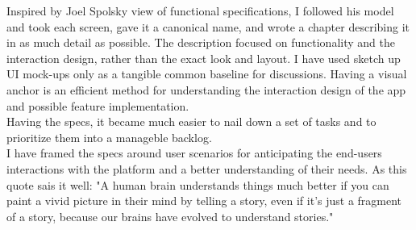 Inspired by Joel Spolsky view of functional specifications, I followed his model and took each screen, gave it a canonical name, and wrote a chapter describing it in as much detail as possible. The description focused on functionality and the interaction design, rather than the exact look and layout. I have used sketch up UI mock-ups only as a tangible common baseline for discussions. Having a visual anchor is an efficient method for understanding the interaction design of the app and possible feature implementation.\\

Having the specs, it became much easier to nail down a set of tasks and to prioritize them into a manageble backlog.\\

I have framed the specs around user scenarios for anticipating the end-users interactions with the platform and a better understanding of their needs. As this quote sais it well: "A human brain understands things much better if you can paint a vivid picture in their mind by telling a story, even if it's just a fragment of a story, because our brains have evolved to understand stories."







